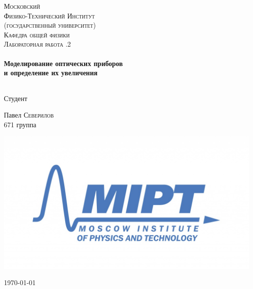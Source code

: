 \begin{titlepage}
\center %
 

\textsc{\LARGE Московский\\[-0.2cm]Физико-Технический Институт\\[0.1cm]\large (государственный университет)}\\[1.5cm] %
\textsc{\Large Кафедра общей физики}\\[0.1cm] %
\textsc{\large Лабораторная работа .2}\\[0.5cm] %


\HRule
\\[0.4cm]
{ \huge \bfseries Моделирование оптических приборов\\[0.2cm]
и определение их увеличения}
\\[0.6cm] %
\HRule
\\[1.5cm]


 

	\begin{flushleft} \large
		\textsf{Студент}
		
		Павел \textsc{Северилов} \\[-0.15cm]
		671 группа
	\end{flushleft}


\begin{bottompar}
	\begin{center}
		\includegraphics[width = 80 mm]{logo.jpg}
	\end{center}
	{\large \today}

\end{bottompar}
\vfill %

\end{titlepage}